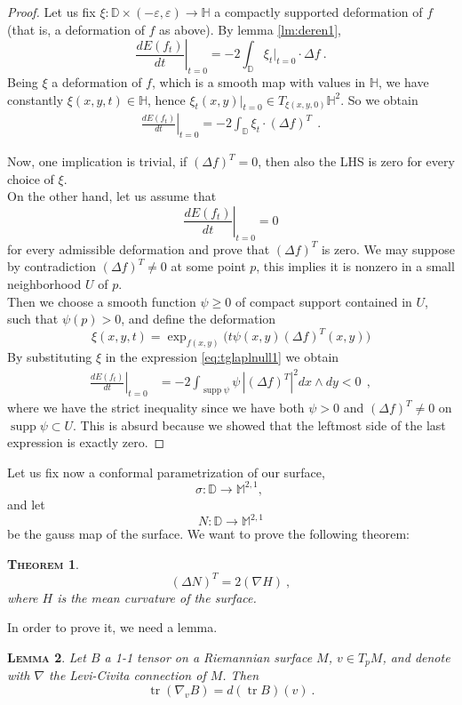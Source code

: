 \documentclass[a4paper,11pt,openright,twoside]{book}
\renewcommand{\epsilon}{\varepsilon}
\newcommand{\M}{\mathbb{M}^{2,1}}
\newcommand{\supp}{\operatorname{supp}}
\newcommand{\tr}{\operatorname{tr}}
\newcommand{\1}{\mathds{1}}
\theoremstyle{plain}
\newtheorem{thm}{\textsc{Theorem}}[chapter]
\newtheorem{lemma}[thm]{\textsc{Lemma}}
\theoremstyle{definition}
\theoremstyle{remark}
\begin{document}
\begin{proof}
Let us fix $\xi:\mathbb{D}\times (-\epsilon,\epsilon) \to \mathbb{H}$ a compactly supported deformation of $f$ (that is, a deformation of $f$ as above).
By lemma \ref{lm:deren1},
\[\left.\frac{dE(f_t)}{dt}\right|_{t=0} = -2 \int_{\mathbb{D}} \xi_t|_{t=0} \cdot \Delta f \ .\] 
Being $\xi$ a deformation of $f$, which is a smooth map with values in $\mathbb{H}$, we have constantly $\xi(x,y,t) \in \mathbb{H}$, hence $\xi_t(x,y)|_{t=0} \in T_{\xi(x,y,0)}\mathbb{H}^2$. So we obtain 
\begin{align}\label{eq:tglaplnull1}
	\left.\frac{dE(f_t)}{dt}\right|_{t=0} 
		= -2 \int_{\mathbb{D}} \xi_t \cdot  (\Delta f)^T
\ \ . 
\end{align}

Now, one implication is trivial, if $(\Delta f)^T = 0$, then also the LHS is zero for every choice of $\xi$.\\

On the other hand, let us assume that \[\left.\frac{dE(f_t)}{dt}\right|_{t=0}=0 \] for every admissible deformation and prove that $(\Delta f)^T$ is zero. We may suppose by contradiction $(\Delta f)^T\neq 0 $ at some point $p$, this implies it is nonzero in a small neighborhood $U$ of $p$.\\
Then we choose a smooth function $\psi \geq 0$ of compact support contained in $U$, such that $\psi(p)>0$, and define the deformation
\[ \xi(x,y,t)=\exp_{f(x,y)}\bigl(t\psi(x,y)(\Delta f)^T(x,y)\bigr)\]
By substituting $\xi$ in the expression \eqref{eq:tglaplnull1} we obtain 
\begin{align*}
	\left.\frac{dE(f_t)}{dt}\right|_{t=0}  &=  -2\int_{\supp \psi } \psi\, |(\Delta f)^T |^2dx\wedge dy
		<0 
\ \ , 
\end{align*}
where we have the strict inequality since we have both $\psi>0$ and $(\Delta f)^T \neq 0$ on $\supp \psi \subset U$. This is absurd because we showed that the leftmost side of the last expression is exactly zero.

\end{proof}
Let us fix now a conformal parametrization of our surface,
\[\sigma : \mathbb{D}\to \M,\ \] 
and let 
\[N:\mathbb{D}\to \M\] 
be the gauss map of the surface.
We want to prove the following theorem:
\begin{thm}\label{th:nablh}
	\[(\Delta N)^T = 2(\nabla H)\ ,\] 
	where $H$ is the mean curvature of the surface.
\end{thm}
In order to prove it, we need a lemma.
\begin{lemma}\label{lm:trnabl}
	Let $B$ a 1-1 tensor on a Riemannian surface $M$, $v\in T_pM$, and denote with $\nabla$ the Levi-Civita connection of $M$. Then
	\[\tr(\nabla_v B)=d(\tr B)(v)\ .\] 
\end{lemma}
\end{document}
